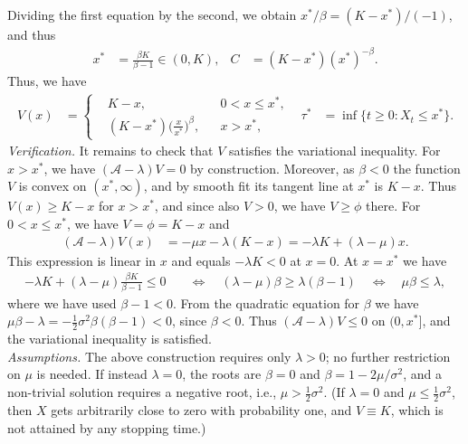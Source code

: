 \documentclass[12pt]{book}
\let\varphi\phi
\numberwithin{equation}{chapter}
\theoremstyle{plain}
\numberwithin{theorem}{section}
\theoremstyle{definition}
\numberwithin{exercise}{chapter}
\newcommand{\<}{\langle}
\renewcommand{\>}{\rangle}
\renewcommand{\(}{\left(}
\renewcommand{\)}{\right)}
\renewcommand{\[}{\left[}
\renewcommand{\]}{\right]}
\newcommand\Ac{\mathscr{A}}
\newcommand\sig{\sigma}
\newcommand\lam{\lambda}
\begin{document}
Dividing the first equation by the second, we obtain $x^*/\beta = (K - x^*)/(-1)$, and thus
\begin{align}
x^*
	&=	\frac{\beta K}{\beta - 1} \in (0,K) , &
C
	&=	(K - x^*) (x^*)^{-\beta} .
\end{align}
Thus, we have
\begin{align}
V(x)
	&=	\left\{ \begin{aligned}
			&K - x , & & 0 < x \leq x^* , \\
			&(K - x^*) \Big( \frac{x}{x^*} \Big)^\beta , & & x > x^* ,
			\end{aligned} \right. &
\tau^*
	&=	\inf \{ t \geq 0 : X_t \leq x^* \} .
\end{align}
\textit{Verification.}  It remains to check that $V$ satisfies the variational inequality.  For $x > x^*$, we have $(\Ac - \lam) V = 0$ by construction.  Moreover, as $\beta < 0$ the function $V$ is convex on $(x^*,\infty)$, and by smooth fit its tangent line at $x^*$ is $K - x$.  Thus $V(x) \geq K - x$ for $x > x^*$, and since also $V > 0$, we have $V \geq \varphi$ there.  For $0 < x \leq x^*$, we have $V = \varphi = K - x$ and
\begin{align}
(\Ac - \lam) V(x)
	&=	- \mu x - \lam ( K - x )
	=		- \lam K + (\lam - \mu) x .
\end{align}
This expression is linear in $x$ and equals $-\lam K < 0$ at $x = 0$.  At $x = x^*$ we have
\begin{align}
- \lam K + (\lam - \mu) \frac{\beta K}{\beta - 1} \leq 0
	&\quad \Leftrightarrow \quad
(\lam - \mu) \beta \geq \lam ( \beta - 1 )
	\quad \Leftrightarrow \quad
\mu \beta \leq \lam ,
\end{align}
where we have used $\beta - 1 < 0$.  From the quadratic equation for $\beta$ we have $\mu \beta - \lam = - \tfrac{1}{2} \sig^2 \beta ( \beta - 1 ) < 0$, since $\beta < 0$.  Thus $(\Ac - \lam) V \leq 0$ on $(0,x^*]$, and the variational inequality is satisfied.
\\[0.5em]
\textit{Assumptions.}  The above construction requires only $\lam > 0$; no further restriction on $\mu$ is needed.  If instead $\lam = 0$, the roots are $\beta = 0$ and $\beta = 1 - 2\mu/\sig^2$, and a non-trivial solution requires a negative root, i.e., $\mu > \tfrac{1}{2} \sig^2$.  (If $\lam = 0$ and $\mu \leq \tfrac{1}{2} \sig^2$, then $X$ gets arbitrarily close to zero with probability one, and $V \equiv K$, which is not attained by any stopping time.)
\end{document}
